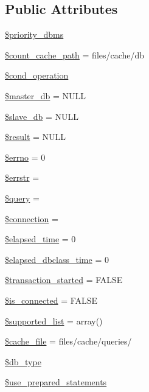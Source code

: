 \subsection*{Public Attributes}
\begin{DoxyCompactItemize}
\item 
\hyperlink{classDB_a082292b9ca3855cbddd3a74e9490ca82}{\$priority\+\_\+dbms}
\item 
\hyperlink{classDB_aca72b9b3a39bb5e5d2e444f20db2c6bb}{\$count\+\_\+cache\+\_\+path} = \textquotesingle{}files/cache/db\textquotesingle{}
\item 
\hyperlink{classDB_a85f8f65c37474b0e65d844e1f01f39b0}{\$cond\+\_\+operation}
\item 
\hyperlink{classDB_ad0a3ae175a659516131cfc6cd615d15c}{\$master\+\_\+db} = N\+U\+L\+L
\item 
\hyperlink{classDB_a0a811a4446882ee9edf0ed846e8926f3}{\$slave\+\_\+db} = N\+U\+L\+L
\item 
\hyperlink{classDB_a74e74ee9d3311aa1e8107b8accd05e29}{\$result} = N\+U\+L\+L
\item 
\hyperlink{classDB_af99d759f7fb3bbadd579d72e686d1cf1}{\$errno} = 0
\item 
\hyperlink{classDB_ae006f35821aba99713b834fa6a69e55b}{\$errstr} = \textquotesingle{}\textquotesingle{}
\item 
\hyperlink{classDB_a32ebabea908efd805a83db48fec3ab52}{\$query} = \textquotesingle{}\textquotesingle{}
\item 
\hyperlink{classDB_ac9071e31f8241ad644430537f39a16ce}{\$connection} = \textquotesingle{}\textquotesingle{}
\item 
\hyperlink{classDB_af5a3fdd4e0078a185dac8c2727fb4f2c}{\$elapsed\+\_\+time} = 0
\item 
\hyperlink{classDB_a0483c1bfe18fa5e8bbe7915f9c8187a7}{\$elapsed\+\_\+dbclass\+\_\+time} = 0
\item 
\hyperlink{classDB_a39a0eef56f82082ca4c69bcad1f12a31}{\$transaction\+\_\+started} = F\+A\+L\+S\+E
\item 
\hyperlink{classDB_aac22b6ebcd8f78c2f70646d381f933dc}{\$is\+\_\+connected} = F\+A\+L\+S\+E
\item 
\hyperlink{classDB_ac09dd547a22963632e063c9ab68b7707}{\$supported\+\_\+list} = array()
\item 
\hyperlink{classDB_a9952a27cbf07942e5bb8853ab95b5bdb}{\$cache\+\_\+file} = \textquotesingle{}files/cache/queries/\textquotesingle{}
\item 
\hyperlink{classDB_a78868b4c2301aa813d9e2d481424f1e8}{\$db\+\_\+type}
\item 
\hyperlink{classDB_a9902aee7d8900a597670fce92c7eb74b}{\$use\+\_\+prepared\+\_\+statements}
\end{DoxyCompactItemize}
